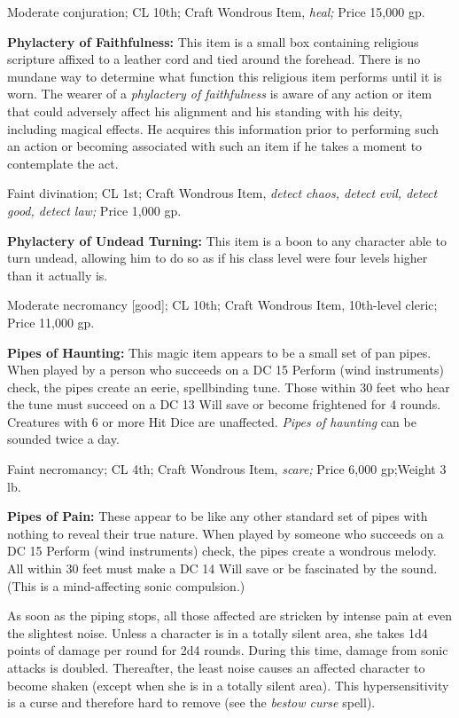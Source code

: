 \documentclass{article}
\begin{document}
Moderate conjuration; CL 10th; Craft Wondrous Item, \textit{heal; }Price 15,000 
gp.

\textbf{Phylactery of Faithfulness:} This item is a small box containing religious 
scripture affixed to a leather cord and tied around the forehead. There is no mundane 
way to determine what function this religious item performs until it is worn. The 
wearer of a \textit{phylactery of faithfulness }is aware of any action or item 
that could adversely affect his alignment and his standing with his deity, including 
magical effects. He acquires this information prior to performing such an action 
or becoming associated with such an item if he takes a moment to contemplate the 
act.

Faint divination; CL 1st; Craft Wondrous Item, \textit{detect chaos, detect evil, 
detect good, detect law; }Price 1,000 gp.

\textbf{Phylactery of Undead Turning:} This item is a boon to any character able 
to turn undead, allowing him to do so as if his class level were four levels higher 
than it actually is.

Moderate necromancy [good]; CL 10th; Craft Wondrous Item, 10th-level cleric; Price 
11,000 gp.

\textbf{Pipes of Haunting: }This magic item appears to be a small set of pan pipes. 
When played by a person who succeeds on a DC 15 Perform (wind instruments) check, 
the pipes create an eerie, spellbinding tune. Those within 30 feet who hear the 
tune must succeed on a DC 13 Will save or become frightened for 4 rounds. Creatures 
with 6 or more Hit Dice are unaffected. \textit{Pipes of haunting }can be sounded 
twice a day.

Faint necromancy; CL 4th; Craft Wondrous Item, \textit{scare; }Price 6,000 gp;Weight 
3 lb.

\textbf{Pipes of Pain:} These appear to be like any other standard set of pipes 
with nothing to reveal their true nature. When played by someone who succeeds on 
a DC 15 Perform (wind instruments) check, the pipes create a wondrous melody. All 
within 30 feet must make a DC 14 Will save or be fascinated by the sound. (This 
is a mind-affecting sonic compulsion.)

As soon as the piping stops, all those affected are stricken by intense pain at 
even the slightest noise. Unless a character is in a totally silent area, she takes 
1d4 points of damage per round for 2d4 rounds. During this time, damage from sonic 
attacks is doubled. Thereafter, the least noise causes an affected character to 
become shaken (except when she is in a totally silent area). This hypersensitivity 
is a curse and therefore hard to remove (see the \textit{bestow curse }spell).
\end{document}
